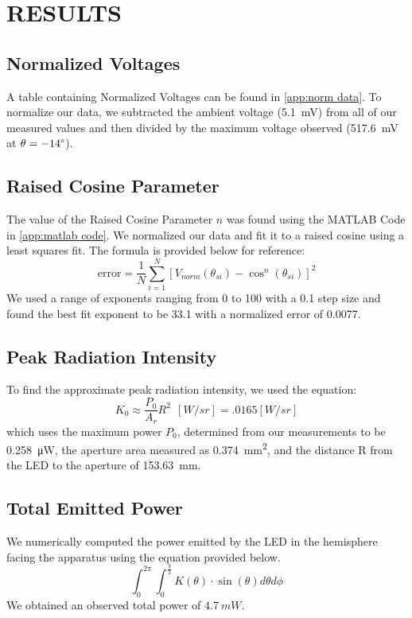 \section{RESULTS}

\subsection{Normalized Voltages}
A table containing Normalized Voltages can be found in \autoref{app:norm data}. To normalize our data, we subtracted the ambient voltage (\SI{5.1}{\milli\volt}) from all of our measured values and then divided by the maximum voltage observed (\SI{517.6}{\milli\volt} at $\theta = -14\degree$).
\subsection{Raised Cosine Parameter}
The value of the Raised Cosine Parameter $n$ was found using the MATLAB Code in \autoref{app:matlab code}. We normalized our data and fit it to a raised cosine using a least squares fit. The formula is provided below for reference:
\[\text{error} = \frac{1}{N}\sum_{i=1}^{N}[V_{norm}(\theta_{si}) - \cos^{n}(\theta_{si})]^{2}\]
We used a range of exponents ranging from 0 to 100 with a 0.1 step size and found the best fit exponent to be 33.1 with a normalized error of 0.0077.

\subsection{Peak Radiation Intensity}
To find the approximate peak radiation intensity, we used the equation:
\[K_{0}\approx \frac{P_{0}}{A_{r}}R^{2}\: \: [W/sr] = .0165 [W/sr]\]
which uses the maximum power $P_0$, determined from our measurements to be \SI{.258}{\micro\watt}, the aperture area measured as \SI{0.374}{mm^2}, and the distance R from the LED to the aperture of \SI{153.63}{mm}.  
\subsection{Total Emitted Power}
We numerically computed the power emitted by the LED in the hemisphere facing the apparatus using the equation provided below.
\[\int_{0}^{2\pi}{\int_{0}^{\frac{\pi}{2}}K(\theta)\cdot \sin(\theta) d \theta d\phi}\]
We obtained an observed total power of $\SI{4.7}{mW}$.

